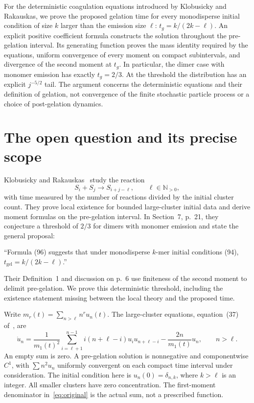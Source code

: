 \documentclass[11pt,a4paper]{report}
\begin{document}
\makepapertitle
\begin{paperabstract}
For the deterministic coagulation equations introduced by Klobusicky and Rakauskas, we prove the proposed gelation time for every monodisperse initial condition of size $k$ larger than the emission size $\ell$: $t_g=k/(2k-\ell)$. An explicit positive coefficient formula constructs the solution throughout the pre-gelation interval. Its generating function proves the mass identity required by the equations, uniform convergence of every moment on compact subintervals, and divergence of the second moment at $t_g$. In particular, the dimer case with monomer emission has exactly $t_g=2/3$. At the threshold the distribution has an explicit $j^{-5/2}$ tail. The argument concerns the deterministic equations and their definition of gelation, not convergence of the finite stochastic particle process or a choice of post-gelation dynamics.
\end{paperabstract}

\section{The open question and its precise scope}
Klobusicky and Rakauskas~\autocite{KR2026} study the reaction
\[
S_i+S_j\longrightarrow S_{i+j-\ell},\qquad \ell\in\mathbb N_{>0},
\]
with time measured by the number of reactions divided by the initial cluster count. They prove local existence for bounded large-cluster initial data and derive moment formulas on the pre-gelation interval. In Section~7, p.~21, they conjecture a threshold of $2/3$ for dimers with monomer emission and state the general proposal:
\begin{openquote}
``Formula (96) suggests that under monodisperse $k$-mer initial conditions (94), $t_{\mathrm{gel}}=k/(2k-\ell)$.''
\end{openquote}
Their Definition~1 and discussion on p.~6 use finiteness of the second moment to delimit pre-gelation. We prove this deterministic threshold, including the existence statement missing between the local theory and the proposed time.

Write $m_r(t)=\sum_{n>\ell}n^r u_n(t)$. The large-cluster equations, equation~(37) of~\autocite{KR2026}, are
\begin{equation}\label{eq:original}
\dot u_n=\frac{1}{m_1(t)^2}\sum_{i=\ell+1}^{n-1}i(n+\ell-i)u_i u_{n+\ell-i}
-\frac{2n}{m_1(t)}u_n,\qquad n>\ell.
\end{equation}
An empty sum is zero. A pre-gelation solution is nonnegative and componentwise $C^1$, with $\sum n^2u_n$ uniformly convergent on each compact time interval under consideration. The initial condition here is $u_n(0)=\delta_{n,k}$, where $k>\ell$ is an integer. All smaller clusters have zero concentration. The first-moment denominator in~\eqref{eq:original} is the actual sum, not a prescribed function.
\end{document}
